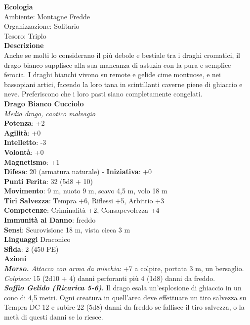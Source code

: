 \begin{multicols}{2}
\textbf{Ecologia}\\
Ambiente: Montagne Fredde\\
Organizzazione: Solitario\\
Tesoro: Triplo\\
\textbf{Descrizione}\\
Anche se molti lo considerano il più debole e bestiale tra i draghi cromatici, il drago bianco supplisce alla sua mancanza di astuzia con la pura e semplice ferocia. I draghi bianchi vivono su remote e gelide cime montuose, e nei bassopiani artici, facendo la loro tana in scintillanti caverne piene di ghiaccio e neve. Preferiscono che i loro pasti siano completamente congelati.\\


\medskip\textbf{Drago Bianco Cucciolo}\\
\emph{Media drago, caotico malvagio}\\
\textbf{Potenza}: +2\\
\textbf{Agilità}: +0\\
\textbf{Intelletto}: -3\\
\textbf{Volontà}: +0\\
\textbf{Magnetismo}: +1\\
\textbf{Difesa}: 20 (armatura naturale) - \textbf{Iniziativa}: +0\\
\textbf{Punti Ferita}: 32 (5d8 + 10)\\
\textbf{Movimento}: 9 m, nuoto 9 m, scavo 4,5 m, volo 18 m\\
\textbf{Tiri Salvezza}: Tempra +6, Riflessi +5, Arbitrio +3\\
\textbf{Competenze}: Criminalità +2, Consapevolezza +4\\
\textbf{Immunità al Danno}: freddo\\
\textbf{Sensi}: Scurovisione 18 m, vista cieca 3 m\\
\textbf{Linguaggi} Draconico\\
\textbf{Sfida}: 2 (450 PE)\smallskip\\
\smallskip\textbf{Azioni}\\
\emph{\textbf{Morso.} Attacco con arma da mischia}: +7 a colpire, portata 3 m, un bersaglio.\\
\emph{Colpisce:} 15 (2d10 + 4) danni perforanti più 4 (1d8) danni da freddo.\\
\emph{\textbf{Soffio Gelido (Ricarica 5-6).}} Il drago esala un'esplosione di ghiaccio in un cono di 4,5 metri. Ogni creatura in quell'area deve effettuare un tiro salvezza su Tempra DC 12 e subire 22 (5d8) danni da freddo se fallisce il tiro salvezza, o la metà di questi danni se lo riesce.

\end{multicols}
